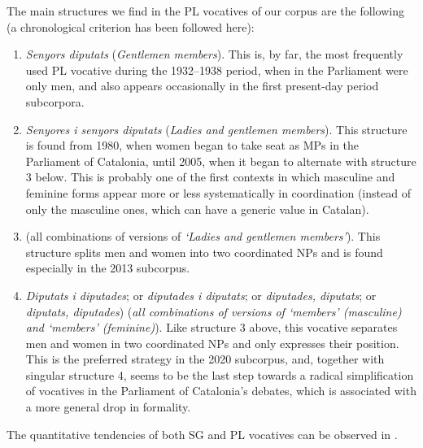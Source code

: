 \documentclass[output=paper]{langscibook}
\begin{document}
The main structures we find in the PL vocatives of our corpus are the following (a chronological criterion has been followed here):

\begin{enumerate}


\item \textit{Senyors diputats} (\textit{Gentlemen members}). This is, by far, the most frequently used PL vocative during the 1932–1938 period, when in the Parliament were only men, and also appears occasionally in the first present-day period subcorpora.



\item\textit{Senyores i senyors diputats} (\textit{Ladies and gentlemen members}). This structure is found from 1980, when women began to take seat as MPs in the Parliament of Catalonia, until 2005, when it began to alternate with structure 3 below. This is probably one of the first contexts in which masculine and feminine forms appear more or less systematically in coordination (instead of only the masculine ones, which can have a generic value in Catalan).



\item{} (all combinations of versions of \textit{‘Ladies and gentlemen members’}). This structure splits men and women into two coordinated NPs and is found especially in the 2013 subcorpus.



\item \textit{Diputats i diputades}; or \textit{diputades i diputats}; or \textit{diputades, diputats}; or \textit{diputats, diputades}) (\textit{all combinations of versions of ‘members’ (masculine) and ‘members’ (feminine)}). Like structure 3 above, this vocative separates men and women in two coordinated NPs and only expresses their position. This is the preferred strategy in the 2020 subcorpus, and, together with singular structure 4, seems to be the last step towards a radical simplification of vocatives in the Parliament of Catalonia’s debates, which is associated with a more general drop in formality.

\end{enumerate}

The quantitative tendencies of both SG and PL vocatives can be observed in .
\end{document}
